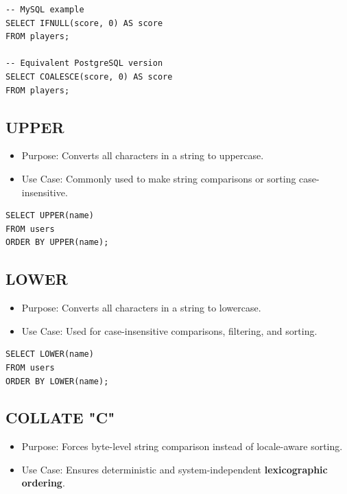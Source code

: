 \documentclass[10pt]{article}
\begin{document}
\begin{verbatim}
-- MySQL example
SELECT IFNULL(score, 0) AS score
FROM players;

-- Equivalent PostgreSQL version
SELECT COALESCE(score, 0) AS score
FROM players;
\end{verbatim}

\subsection{UPPER}
\begin{itemize}
    \item Purpose: Converts all characters in a string to uppercase.
    \item Use Case: Commonly used to make string comparisons or sorting case-insensitive.
\end{itemize}

\begin{verbatim}
SELECT UPPER(name)
FROM users
ORDER BY UPPER(name);
\end{verbatim}

\subsection{LOWER}
\begin{itemize}
    \item Purpose: Converts all characters in a string to lowercase.
    \item Use Case: Used for case-insensitive comparisons, filtering, and sorting.
\end{itemize}

\begin{verbatim}
SELECT LOWER(name)
FROM users
ORDER BY LOWER(name);
\end{verbatim}

\subsection{COLLATE "C"}
\begin{itemize}
    \item Purpose: Forces byte-level string comparison instead of locale-aware sorting.
	\item Use Case: Ensures deterministic and system-independent \textbf{lexicographic ordering}.
\end{itemize}
\end{document}
